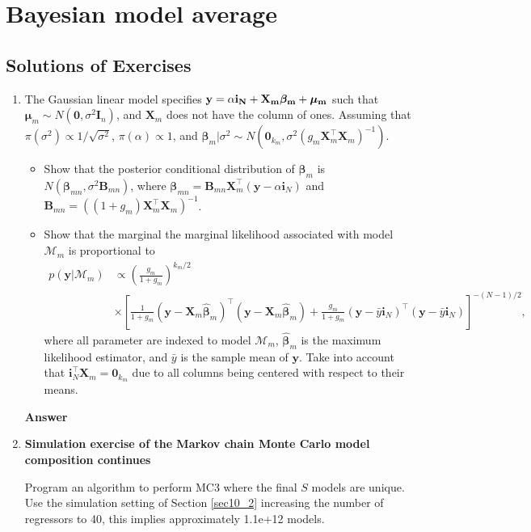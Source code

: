 \chapter{Bayesian model average}\label{chap10}

\section{Solutions of Exercises}\label{sec101}
\begin{enumerate}[leftmargin=*]

	\item The Gaussian linear model specifies $\bf{y}=\alpha\bm{i}_N+\bm{X}_m\bm{\beta}_m+\bm{\mu}_m$ such that $\bm{\mu}_m\sim{N}(\bm{0},\sigma^2\bm{I}_n)$, and $\bm{X}_m$ does not have the column of ones. Assuming that $\pi(\sigma^2)\propto 1/\sqrt{\sigma^2}$, $\pi(\alpha)\propto 1$, and $\bm{\beta}_m|\sigma^2 \sim {N}(\bm{0}_{k_m}, \sigma^2 (g_m\bm{X}_m^{\top}\bm{X}_m)^{-1})$.
\begin{itemize}
	\item Show that the posterior conditional distribution of $\bm{\beta}_m$ is $N(\bm{\beta}_{mn},\sigma^2\bm{B}_{mn})$, where $\bm{\beta}_{mn}=\bm{B}_{mn}\bm{X}_m^{\top}(\bm{y}-\alpha\bm{i}_N)$ and $\bm{B}_{mn}=((1+g_m)\bm{X}_m^{\top}\bm{X}_m)^{-1}$.
	\item Show that the marginal the marginal likelihood associated with model $\mathcal{M}_m$ is proportional to
	\begin{align*}
		p(\bm{y}|\mathcal{M}_m)&\propto \left(\frac{g_m}{1+g_m}\right)^{k_m/2}\\
		&\times \left[\frac{1}{1+g_m}(\bm{y}-\bm{X}_m\hat{\bm{\beta}}_m)^{\top}(\bm{y}-\bm{X}_m\hat{\bm{\beta}}_m)+\frac{g_m}{1+g_m}(\bm{y}-\bar{y}\bm{i}_N)^{\top}(\bm{y}-\bar{y}\bm{i}_N)\right]^{-(N-1)/2},
	\end{align*}
	where all parameter are indexed to model $\mathcal{M}_m$, $\hat{\bm{\beta}}_m$ is the maximum likelihood estimator, and $\bar{y}$ is the sample mean of $\bm{y}$. Take into account that $\bm{i}_N^{\top}\bm{X}_m=\bm{0}_{k_m}$ due to all columns being centered with respect to their means.   
\end{itemize}

\textbf{Answer}

\item \textbf{Simulation exercise of the Markov chain Monte Carlo model composition continues}

Program an algorithm to perform MC3 where the final $S$ models are unique. Use the simulation setting of Section \ref{sec10_2} increasing the number of regressors to 40, this implies approximately 1.1e+12 models. 	
	

\end{enumerate}
